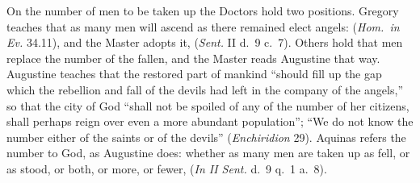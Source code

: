 On the number of men to be taken up the Doctors hold two positions. Gregory teaches
that as many men will ascend as there remained elect angels:  (\emph{Hom.\ in Ev.} 34.11), and the Master adopts
it,  (\emph{Sent.} II d.~9
c.~7). Others hold that men replace the number of the fallen, and the Master
reads Augustine that way. Augustine teaches that the restored part of
mankind ``should fill up the gap which the rebellion and fall of the devils
had left in the company of the angels,'' so that the city of God ``shall not
be spoiled of any of the number of her citizens, shall perhaps reign over
even a more abundant population''; ``We do not know the number either of the
saints or of the devils'' (\emph{Enchiridion} 29). Aquinas refers the
number to God, as Augustine does: whether as many men are taken up as fell,
or as stood, or both, or more, or fewer,  (\emph{In II Sent.}
d.~9 q.~1 a.~8).

